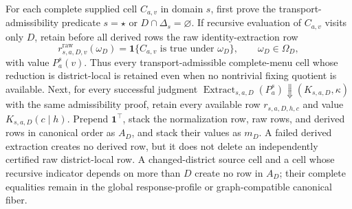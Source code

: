 For each complete supplied cell \(C_{a,v}\) in domain \(s\), first prove the transport-admissibility predicate \(s=\star\) or \(D\cap\Delta_s=\varnothing\).  If recursive evaluation of \(C_{a,v}\) visits only \(D\), retain before all derived rows the raw identity-extraction row
\[
r^{\mathrm{raw}}_{s,a,D,v}(\omega_D)=\mathbf 1\{C_{a,v}\text{ is true under }\omega_D\},
\qquad \omega_D\in\Omega_D,
\]
with value \(P_a^s(v)\).  Thus every transport-admissible complete-menu cell whose reduction is district-local is retained even when no nontrivial fixing quotient is available.  Next, for every successful judgment \(\operatorname{Extract}_{s,a,D}(P_a^s)\Downarrow(K_{s,a,D},\kappa)\) with the same admissibility proof, retain every available row \(r_{s,a,D,h,c}\) and value \(K_{s,a,D}(c\mid h)\).  Prepend \(\mathbf 1^\top\), stack the normalization row, raw rows, and derived rows in canonical order as \(A_D\), and stack their values as \(m_D\).  A failed derived extraction creates no derived row, but it does not delete an independently certified raw district-local row.  A changed-district source cell and a cell whose recursive indicator depends on more than \(D\) create no row in \(A_D\); their complete equalities remain in the global response-profile or graph-compatible canonical fiber.
